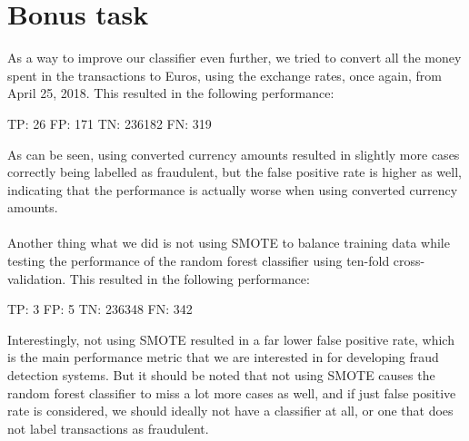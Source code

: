 \documentclass[]{article}
\begin{document}
\section{Bonus task}
As a way to improve our classifier even further, we tried to convert all the money spent in the transactions to Euros, using the exchange rates, once again, from April 25, 2018. This resulted in the following performance:
\begin{flushleft}
	TP: 26 \newline
	FP: 171  \newline
	TN: 236182 \newline
	FN: 319 \newline
\end{flushleft}
As can be seen, using converted currency amounts resulted in slightly more cases correctly being labelled as fraudulent, but the false positive rate is higher as well, indicating that the performance is actually worse when using converted currency amounts.\\
\\
Another thing what we did is not using SMOTE to balance training data while testing the performance of the random forest classifier using ten-fold cross-validation. This resulted in the following performance:
\begin{flushleft}
	TP: 3 \newline
	FP: 5  \newline
	TN: 236348 \newline
	FN: 342 \newline
\end{flushleft}
Interestingly, not using SMOTE resulted in a far lower false positive rate, which is the main performance metric that we are interested in for developing fraud detection systems. But it should be noted that not using SMOTE causes the random forest classifier to miss a lot more cases as well, and if just false positive rate is considered, we should ideally not have a classifier at all, or one that does not label transactions as fraudulent.
\clearpage


\end{document}
